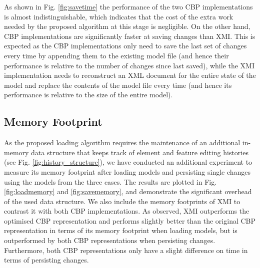 \documentclass{llncs}
\begin{document}
As shown in Fig. \ref{fig:savetime} the performance of the two CBP implementations is almost indistinguishable, which indicates that the cost of the extra work needed by the proposed algorithm at this stage is negligible. On the other hand, CBP implementations are significantly faster at saving changes than XMI. This is expected as the CBP implementations only need to save the last set of changes every time by appending them to the existing model file (and hence their performance is relative to the number of changes since last saved), while the XMI implementation needs to reconstruct an XML document for the entire state of the model and replace the contents of the model file every time (and hence its performance is relative to the size of the entire model). 
         
\subsection{Memory Footprint}
\label{subsec:memory_consumption}

As the proposed loading algorithm requires the maintenance of an additional in-memory data structure that keeps track of element and feature editing histories (see Fig. \ref{fig:history_structure}), we have conducted an additional experiment to measure its memory footprint after loading models and persisting single changes using the models from the three cases. The results are plotted in Fig. \ref{fig:loadmemory} and \ref{fig:savememory}, and demonstrate the significant overhead of the used data structure. We also include the memory footprints of XMI to contrast it with both CBP implementations. As observed, XMI outperforms the optimised CBP representation and performs slightly better than the original CBP representation in terms of its memory footprint when loading models, but is outperformed by both CBP representations when persisting changes. Furthermore, both CBP representations only have a slight difference on time in terms of persisting changes.
\end{document}
